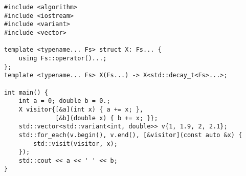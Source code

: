 \begin{lstlisting}[title=\href{https://godbolt.org/z/rKdTv5}{\texttt{godbolt.org/z/rKdTv5}}]
#include <algorithm>
#include <iostream>
#include <variant>
#include <vector>

template <typename... Fs> struct X: Fs... {
    using Fs::operator()...;
};
template <typename... Fs> X(Fs...) -> X<std::decay_t<Fs>...>;

int main() {
    int a = 0; double b = 0.;
    X visitor{[&a](int x) { a += x; },
              [&b](double x) { b += x; }};
    std::vector<std::variant<int, double>> v{1, 1.9, 2, 2.1};
    std::for_each(v.begin(), v.end(), [&visitor](const auto &x) {
        std::visit(visitor, x);
    });
    std::cout << a << ' ' << b;
}
\end{lstlisting}
